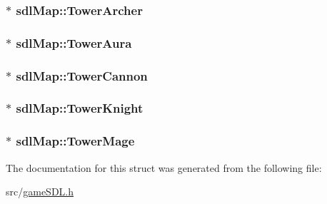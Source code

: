\subsubsection[{Tower\+Archer}]{$\ast$ sdl\+Map\+::\+Tower\+Archer}\label{structsdl_map_a1a34a71be9d9e2b9e3f9c9dbb6ecbda7}
\hypertarget{structsdl_map_a72869f765a524d7ce53dac7e30a87344}{}
\subsubsection[{Tower\+Aura}]{$\ast$ sdl\+Map\+::\+Tower\+Aura}\label{structsdl_map_a72869f765a524d7ce53dac7e30a87344}
\hypertarget{structsdl_map_af8621dd16aaf2811edb2cd5b667de435}{}
\subsubsection[{Tower\+Cannon}]{$\ast$ sdl\+Map\+::\+Tower\+Cannon}\label{structsdl_map_af8621dd16aaf2811edb2cd5b667de435}
\hypertarget{structsdl_map_a17cb76e625d269d401a1e878436377dd}{}
\subsubsection[{Tower\+Knight}]{$\ast$ sdl\+Map\+::\+Tower\+Knight}\label{structsdl_map_a17cb76e625d269d401a1e878436377dd}
\hypertarget{structsdl_map_aedc2a06f1f47c80edc6b7510830202d6}{}
\subsubsection[{Tower\+Mage}]{$\ast$ sdl\+Map\+::\+Tower\+Mage}\label{structsdl_map_aedc2a06f1f47c80edc6b7510830202d6}


The documentation for this struct was generated from the following file\+:\begin{DoxyCompactItemize}
\item 
src/\hyperlink{game_s_d_l_8h}{game\+S\+D\+L.\+h}\end{DoxyCompactItemize}
